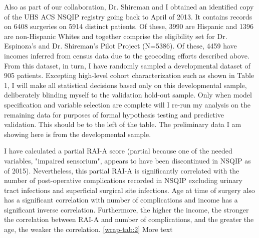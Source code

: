 Also as part of our collaboration, Dr. Shireman and I obtained an identified copy of the UHS ACS NSQIP registry going back to April of 2013. It contains records on 6408 surgeries on 5914 distinct patients. Of these, 3990 are Hispanic and 1396 are non-Hispanic Whites and together comprise the eligibility set for Dr. Espinoza's and Dr. Shireman's Pilot Project (N=5386). Of these, 4459 have incomes inferred from census data due to the geocoding efforts described above. From this dataset, in turn, I have randomly sampled a developmental dataset of 905 patients. Excepting high-level cohort characterization such as shown in Table 1, I will make all statistical decisions based only on this developmental sample, deliberately blinding myself to the validation hold-out sample. Only when model specification and variable selection are complete will I re-run my analysis on the remaining data for purposes of formal hypothesis testing and predictive validation. This should be to the left of the table. The preliminary data I am showing here is from the developmental sample.

I have calculated a partial RAI-A score (partial because one of the needed variables, "impaired sensorium", appears to have been discontinued in NSQIP as of 2015). Nevertheless, this partial RAI-A is significantly correlated with the number of post-operative complications recorded in NSQIP excluding urinary tract infections and superficial surgical site infections. Age at time of surgery also has a significant correlation with number of complications and income has a significant inverse correlation. Furthermore, the higher the income, the stronger the correlation between RAI-A and number of complications, and the greater the age, the weaker the correlation. \ref{wrap-tab:2} More text

